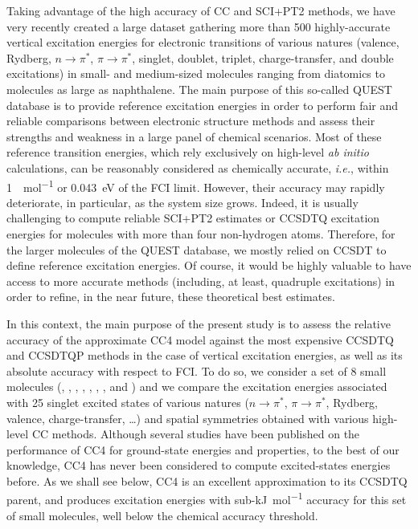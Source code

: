 \documentclass[aip,jcp,reprint,noshowkeys,superscriptaddress]{revtex4-1}
\newcommand{\ie}{\textit{i.e.}}
\newcommand{\npis}{n \to \pi^*}
\newcommand{\pipis}{\pi \to \pi^*}
\begin{document}
Taking advantage of the high accuracy of CC and SCI+PT2 methods, we have very recently created a large dataset gathering more than 500 highly-accurate vertical excitation energies for electronic transitions of various natures (valence, Rydberg, $\npis$, $\pipis$, singlet, doublet, triplet, charge-transfer, and double excitations) in small- and medium-sized molecules ranging from diatomics to molecules as large as naphthalene. \cite{Loos_2018a,Loos_2019,Loos_2020a,Loos_2020b,Loos_2020c,Veril_2021}
The main purpose of this so-called QUEST database is to provide reference excitation energies in order to perform fair and reliable comparisons between electronic structure methods and assess their strengths and weakness in a large panel of chemical scenarios.
Most of these reference transition energies, which rely exclusively on high-level \textit{ab initio} calculations, can be reasonably considered as chemically accurate, \ie, within \SI{1}{\kcal\per\mol} or \SI{0.043}{\eV} of the FCI limit.
However, their accuracy may rapidly deteriorate, in particular, as the system size grows.
Indeed, it is usually challenging to compute reliable SCI+PT2 estimates or CCSDTQ excitation energies for molecules with more than four non-hydrogen atoms.
Therefore, for the larger molecules of the QUEST database, we mostly relied on CCSDT to define reference excitation energies.
Of course, it would be highly valuable to have access to more accurate methods (including, at least, quadruple excitations) in order to refine, in the near future, these theoretical best estimates.

In this context, the main purpose of the present study is to assess the relative accuracy of the approximate CC4 model against the most expensive CCSDTQ and CCSDTQP methods in the case of vertical excitation energies, as well as its absolute accuracy with respect to FCI.
To do so, we consider a set of 8 small molecules (, , , , , , , and ) and we compare the excitation energies associated with 25 singlet excited states of various natures ($\npis$, $\pipis$, Rydberg, valence, charge-transfer, \ldots) and spatial symmetries obtained with various high-level CC methods.
Although several studies have been published on the performance of CC4 for ground-state energies and properties, \cite{Kallay_2005,Matthews_2015a,Matthews_2021} to the best of our knowledge, CC4 has never been considered to compute excited-states energies before.
As we shall see below, CC4 is an excellent approximation to its CCSDTQ parent, and produces excitation energies with sub-\si{\kJ\per\mol} accuracy for this set of small molecules, well below the chemical accuracy threshold.
\end{document}
